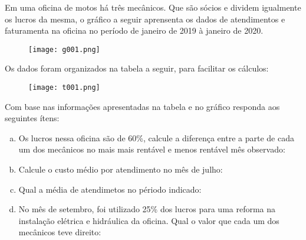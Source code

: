 \begin{exem} Em uma oficina de motos há três mecânicos. Que são sócios e dividem igualmente os lucros da mesma, o gráfico a seguir aprensenta os dados de atendimentos e faturamenta na oficina no período de janeiro de 2019 à janeiro de 2020.

	\begin{figure}[!tbh]
	\center
	\texttt{[image: g001.png]}
	\end{figure}

Os dados foram organizados na tabela a seguir, para facilitar os cálculos:

	\begin{figure}[!tbh]
	\center
	\texttt{[image: t001.png]}
	\end{figure}		

\noindent Com base nas informações apresentadas na tabela e no gráfico responda aos seguintes ítens:
\end{exem}

\begin{enumerate}[a)]
\item Os lucros nessa oficina são de 60\%, calcule a diferença entre a parte de cada um dos mecânicos no mais mais rentável e menos rentável mês observado:
\item Calcule o custo médio por atendimento no mês de julho:
\item Qual a média de atendimetos no périodo indicado:
\item No mês de setembro, foi utilizado 25\% dos lucros para uma reforma na instalação elétrica e hidráulica da oficina. Qual o valor que cada um dos mecânicos teve direito:
\end{enumerate}
